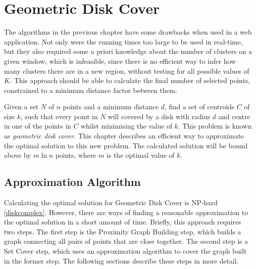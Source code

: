 \cleardoublepage
\chapter{Geometric Disk Cover}
\label{chap:approx}

The algorithms in the previous chapter have some drawbacks when used in a web application. Not only were the running times too large to be used in real-time, but they also required some a priori knowledge about the number of clusters on a given window, which is infeasible, since there is no efficient way to infer how many clusters there are in a new region, without testing for all possible values of $K$. This approach should be able to calculate the final number of selected points, constrained to a minimum distance factor between them.

Given a set $N$ of $n$ points and a minimum distance $d$, find a set of centroids $C$ of size $k$, such that every point in $N$ will covered by a disk with radius $d$ and centre in one of the points in $C$ whilst minimising the value of $k$. This problem is known as \emph{geometric disk cover}\cite{geodisk}. This chapter describes an efficient way to approximate the optimal solution to this new problem. The calculated solution will be bound above by $m \ln {n}$ points, where $m$ is the optimal value of $k$.

\section{Approximation Algorithm}
Calculating the optimal solution for Geometric Disk Cover is {NP-hard} \ref{diskcomplex}. However, there are ways of finding a reasonable approximation to the optimal solution in a short amount of time. Briefly, this approach requires two steps. The first step is the Proximity Graph Building step, which builds a graph connecting all pairs of points that are close together. The second step is a Set Cover step, which uses an approximation algorithm to cover the graph built in the former step. The following sections describe these steps in more detail.

